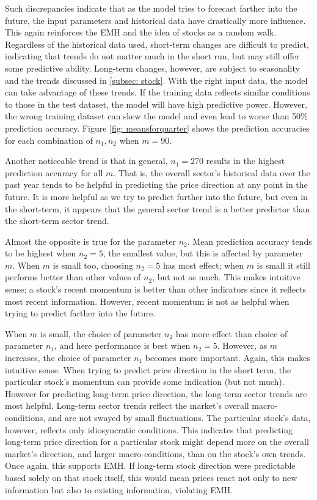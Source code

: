 \documentclass[pageno]{jpaper}
\begin{document}
Such discrepancies indicate that as the model tries to forecast farther into the future, the input parameters and historical data have drastically more influence. This again reinforces the EMH and the idea of stocks as a random walk. Regardless of the historical data used, short-term changes are difficult to predict, indicating that trends do not matter much in the short run, but may still offer some predictive ability. Long-term changes, however, are subject to seasonality and the trends discussed in \ref{subsec: stock}. With the right input data, the model can take advantage of these trends. If the training data reflects similar conditions to those in the test dataset, the model will have high predictive power. However, the wrong training dataset can skew the model and even lead to worse than 50\% prediction accuracy. Figure \ref{fig: meansforquarter} shows the prediction accuracies for each combination of $n_1, n_2$ when $m=90$.

Another noticeable trend is that in general, $n_1 = 270$ results in the highest prediction accuracy for all $m$. That is, the overall sector’s historical data over the past year tends to be helpful in predicting the price direction at any point in the future. It is more helpful as we try to predict further into the future, but even in the short-term, it appears that the general sector trend is a better predictor than the short-term sector trend.

Almost the opposite is true for the parameter $n_2$. Mean prediction accuracy tends to be highest when $n_2 = 5$, the smallest value, but this is affected by parameter $m$. When $m$ is small too, choosing $n_2=5$ has most effect; when $m$ is small it still performs better than other values of $n_2$, but not as much.  This makes intuitive sense; a stock’s recent momentum is better than other indicators since it reflects most recent information. However, recent momentum is not as helpful when trying to predict farther into the future.

When $m$ is small, the choice of parameter $n_2$ has more effect than choice of parameter $n_1$, and here performance is best when $n_2 = 5$. However, as $m$ increases, the choice of parameter $n_1$ becomes more important. Again, this makes intuitive sense. When trying to predict price direction in the short term, the particular stock’s momentum can provide some indication (but not much). However for predicting long-term price direction, the long-term sector trends are most helpful. Long-term sector trends reflect the market’s overall macro-conditions, and are not swayed by small fluctuations. The particular stock’s data, however, reflects only idiosyncratic conditions. This indicates that predicting long-term price direction for a particular stock might depend more on the overall market’s direction, and larger macro-conditions, than on the stock’s own trends. Once again, this supports EMH. If long-term stock direction were predictable based solely on that stock itself, this would mean prices react not only to new information but also to existing information, violating EMH.
\end{document}
